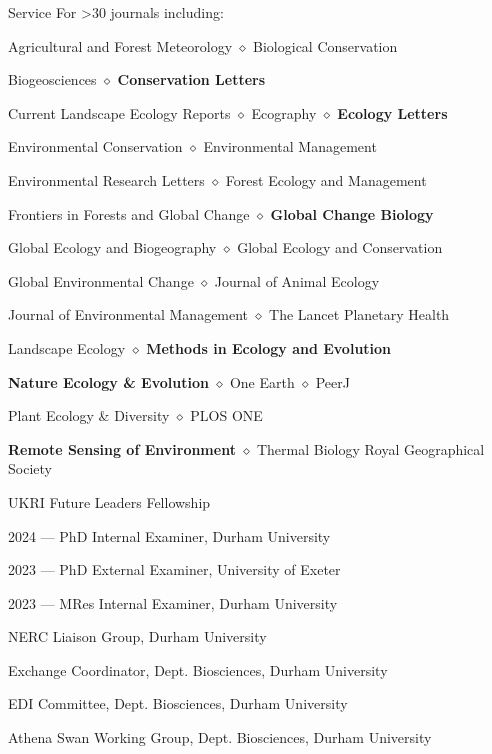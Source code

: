 
\begin{rubric}{Service}
	For >30 journals including:
	\par Agricultural and Forest Meteorology $\diamond$ Biological Conservation
	\par Biogeosciences $\diamond$ \textbf{Conservation Letters}
	\par Current Landscape Ecology Reports $\diamond$ Ecography $\diamond$ \textbf{Ecology Letters}
	\par Environmental Conservation $\diamond$ Environmental Management
	\par Environmental Research Letters $\diamond$ Forest Ecology and Management
	\par Frontiers in Forests and Global Change $\diamond$ \textbf{Global Change Biology} 
	\par Global Ecology and Biogeography $\diamond$ Global Ecology and Conservation 
	\par Global Environmental Change $\diamond$ Journal of Animal Ecology
	\par Journal of Environmental Management $\diamond$ The Lancet Planetary Health
	\par Landscape Ecology $\diamond$ \textbf{Methods in Ecology and Evolution}
	\par \textbf{Nature Ecology \& Evolution} $\diamond$ One Earth $\diamond$ PeerJ
	\par Plant Ecology \& Diversity $\diamond$ PLOS ONE
	\par \textbf{Remote Sensing of Environment} $\diamond$ Thermal Biology
	Royal Geographical Society
	\par UKRI Future Leaders Fellowship 
	\par 2024 --- PhD Internal Examiner, Durham University
	\par 2023 --- PhD External Examiner, University of Exeter
	\par 2023 --- MRes Internal Examiner, Durham University
	\par NERC Liaison Group, Durham University
	\par Exchange Coordinator, Dept. Biosciences, Durham University
	\par EDI Committee, Dept. Biosciences, Durham University
	\par Athena Swan Working Group, Dept. Biosciences, Durham University

\end{rubric}
